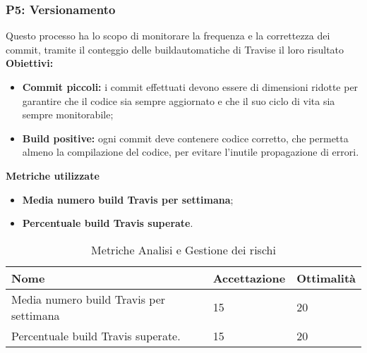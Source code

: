 \subsubsection{P5: Versionamento}
Questo processo ha lo scopo di monitorare la frequenza e la correttezza dei commit\pedice, tramite il conteggio delle build\pedice automatiche di Travis\pedice e il loro risultato \\
\textbf{Obiettivi:}
\begin{itemize}
	\item\textbf{Commit piccoli:} i commit effettuati devono essere di dimensioni ridotte per garantire che il codice sia sempre aggiornato e che il suo ciclo di vita sia sempre monitorabile;
	\item\textbf{Build positive:} ogni commit deve contenere codice corretto, che permetta almeno la compilazione del codice, per evitare l'inutile propagazione di errori.\\
\end{itemize}
\textbf{Metriche utilizzate}
\begin{itemize}
	\item{\textbf{Media numero build Travis per settimana};}
	\item{\textbf{Percentuale build Travis superate}.}
\end{itemize}
\begin{table}[!htbp]
	\centering
	\renewcommand{\arraystretch}{2} 
		\begin{tabular}{|l|l|l|}
			\rowcolor{orange!50}
			\hline
			Nome & Accettazione & Ottimalità \\
			\hline
			Media numero build Travis per settimana & 15 & 20 \\
			\hline
			Percentuale build Travis superate. & 15 & 20 \\
			\hline
		\end{tabular}
	\caption{Metriche Analisi e Gestione dei rischi}
\end{table}
\newpage
